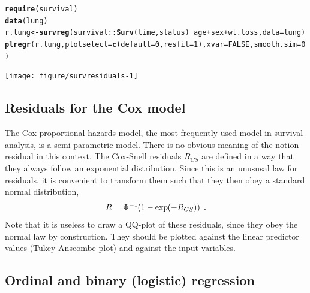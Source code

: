\documentclass[11pt]{article}\usepackage[]{graphicx}\usepackage[]{color}
\makeatletter
\newcommand{\hlnum}[1]{\textcolor[rgb]{0.686,0.059,0.569}{#1}}%
\newcommand{\hlopt}[1]{\textcolor[rgb]{0,0,0}{#1}}%
\newcommand{\hlstd}[1]{\textcolor[rgb]{0.345,0.345,0.345}{#1}}%
\newcommand{\hlkwb}[1]{\textcolor[rgb]{0.69,0.353,0.396}{#1}}%
\newcommand{\hlkwc}[1]{\textcolor[rgb]{0.333,0.667,0.333}{#1}}%
\newcommand{\hlkwd}[1]{\textcolor[rgb]{0.737,0.353,0.396}{\textbf{#1}}}%
\newenvironment{kframe}{%
 \def\at@end@of@kframe{}%
 \ifinner\ifhmode%
  \def\at@end@of@kframe{\end{minipage}}%
  \begin{minipage}{\columnwidth}%
 \fi\fi%
 \def\FrameCommand##1{\hskip\@totalleftmargin \hskip-\fboxsep
 \colorbox{shadecolor}{##1}\hskip-\fboxsep
     \hskip-\linewidth \hskip-\@totalleftmargin \hskip\columnwidth}%
 \MakeFramed {\advance\hsize-\width
   \@totalleftmargin\z@ \linewidth\hsize
   \@setminipage}}%
 {\par\unskip\endMakeFramed%
 \at@end@of@kframe}
\newenvironment{knitrout}{}{} %
\makeatother
\begin{document}
\begin{knitrout}
\color{fgcolor}\begin{kframe}
\begin{alltt}
\hlkwd{require}\hlstd{(survival)}
\hlkwd{data}\hlstd{(lung)}
\hlstd{r.lung} \hlkwb{<-} \hlkwd{survreg}\hlstd{(survival}\hlopt{::}\hlkwd{Surv}\hlstd{(time,status)} \hlopt{~} \hlstd{age}\hlopt{+}\hlstd{sex}\hlopt{+}\hlstd{wt.loss,} \hlkwc{data}\hlstd{=lung)}
\hlkwd{plregr}\hlstd{(r.lung,} \hlkwc{plotselect}\hlstd{=}\hlkwd{c}\hlstd{(}\hlkwc{default}\hlstd{=}\hlnum{0}\hlstd{,} \hlkwc{resfit}\hlstd{=}\hlnum{1}\hlstd{),} \hlkwc{xvar}\hlstd{=}\hlnum{FALSE}\hlstd{,} \hlkwc{smooth.sim}\hlstd{=}\hlnum{0}\hlstd{)}
\end{alltt}
\end{kframe}
\texttt{[image: figure/survresiduals-1]} 

\end{knitrout}

\subsection{Residuals for the Cox model}

The Cox proportional hazards model, the most frequently used model in
survival analysis, is a semi-parametric model. There is no obvious meaning
of the notion residual in this context. 
The Cox-Snell residuals $R_{CS}$ are defined in a way that they always
follow an exponential distribution. 
Since this is an unususal law for residuals, it is convenient to transform
them such that they then obey a standard normal distribution,
\[
  R = \Phi^{-1}\kern-2pt\left(1-\exp\kern-2pt\left(-R_{CS}\right)\right)
\;.\]
Note that it is useless to draw a QQ-plot of these residuals, since they
obey the normal law by construction. 
They should be plotted against the linear predictor values 
(Tukey-Anscombe plot) and against the input variables.



\subsection{Ordinal and binary (logistic) regression}
\end{document}
